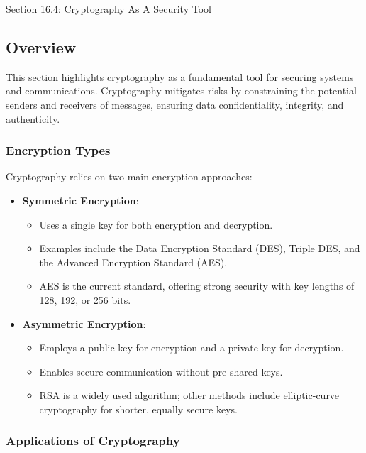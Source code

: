 \begin{notes}{Section 16.4: Cryptography As A Security Tool}
    \subsection*{Overview}

    This section highlights cryptography as a fundamental tool for securing systems and communications. Cryptography mitigates risks by constraining the potential senders and receivers of messages, 
    ensuring data confidentiality, integrity, and authenticity.
    
    \subsubsection*{Encryption Types}
    
    Cryptography relies on two main encryption approaches:
    \begin{itemize}
        \item \textbf{Symmetric Encryption}:
        \begin{itemize}
            \item Uses a single key for both encryption and decryption.
            \item Examples include the Data Encryption Standard (DES), Triple DES, and the Advanced Encryption Standard (AES).
            \item AES is the current standard, offering strong security with key lengths of 128, 192, or 256 bits.
        \end{itemize}
        \item \textbf{Asymmetric Encryption}:
        \begin{itemize}
            \item Employs a public key for encryption and a private key for decryption.
            \item Enables secure communication without pre-shared keys.
            \item RSA is a widely used algorithm; other methods include elliptic-curve cryptography for shorter, equally secure keys.
        \end{itemize}
    \end{itemize}
    
    \subsubsection*{Applications of Cryptography}
    

\end{notes}
